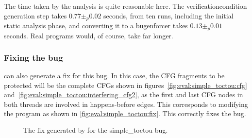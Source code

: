 The time taken by the analysis is quite reasonable here.  The
\gls{verificationcondition} generation step takes $0.77 \pm_p 0.02$
seconds, from ten runs, including the initial static analysis phase,
and converting it to a \gls{bugenforcer} takes $0.13 \pm_p 0.01$
seconds.  Real programs would, of course, take far longer.

\subsubsection{Fixing the bug}
{\Implementation} can also generate a fix for this bug.  In this case,
the CFG fragments to be protected will be the complete CFGs shown in
figures~\ref{fig:eval:simple_toctou:cfg}
and~\ref{fig:eval:simple_toctou:interfering_cfg2}, as the first and
last CFG nodes in both threads are involved in happens-before edges.
This corresponds to modifying the program as shown in
\autoref{fig:eval:simple_toctou:fix}.  This correctly fixes the
bug.

\begin{figure}
  \centerline{
    {\hfill}
  {\hfill}
  \hfill
  }
  \caption{The fix generated by {\implementation} for the simple\_toctou bug.}
  \label{fig:eval:simple_toctou:fix}
\end{figure}

